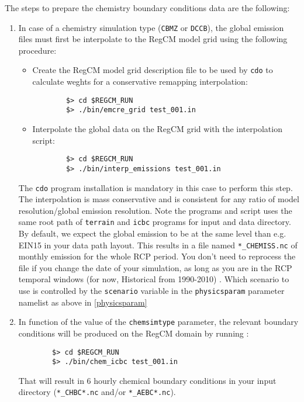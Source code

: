 The steps to prepare the chemistry boundary conditions data are the following:

\begin{enumerate}
  \item In case of a chemistry simulation type (\verb=CBMZ= or \verb=DCCB=), the
    global emission files must first be interpolate to the RegCM model grid
    using the following procedure:
    \begin{itemize}
      \item Create the RegCM model grid description file to be used by
        \verb=cdo= to calculate weghts for a conservative remapping
        interpolation:
        \begin{Verbatim}
        $> cd $REGCM_RUN
        $> ./bin/emcre_grid test_001.in
        \end{Verbatim}
      \item Interpolate the global data on the RegCM grid with the interpolation
        script:
        \begin{Verbatim}
        $> cd $REGCM_RUN
        $> ./bin/interp_emissions test_001.in
        \end{Verbatim}
    \end{itemize}
    The \verb=cdo= program installation is mandatory in this case to perform
    this step. The interpolation is mass conservative and is consistent for
    any ratio of model resolution/global emission resolution.
    Note the programs and script uses the same root path of \verb=terrain= and
    \verb=icbc= programs for input and data directory. By default, we expect
    the global emission to be at the same level than e.g. EIN15 in your data
    path layout.
    This results in a file named \verb=*_CHEMISS.nc= of monthly emission for
    the whole RCP period. You don’t need to reprocess the file if you change
    the date of your simulation, as long as you are in the RCP temporal windows
    (for now, Historical from 1990-2010) .
    Which scenario to use is controlled by the \verb=scenario= variable in the
    \verb=physicsparam= parameter namelist as above in \ref{physicsparam}
  \item In function of the value of the \verb=chemsimtype= parameter, the
    relevant boundary conditions will be produced on the RegCM domain by
    running :
        \begin{Verbatim}
        $> cd $REGCM_RUN
        $> ./bin/chem_icbc test_001.in
        \end{Verbatim}
    That will result in 6 hourly chemical boundary conditions in your input
    directory (\verb=*_CHBC*.nc= and/or \verb=*_AEBC*.nc=).
\end{enumerate}

